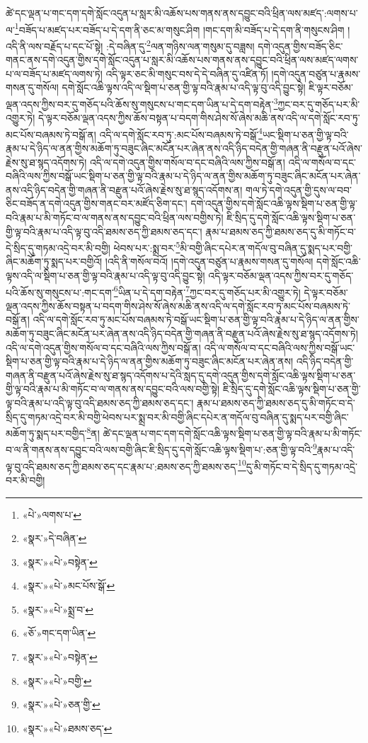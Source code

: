 ཚེ་དང་ལྡན་པ་གང་དག་དགེ་སློང་འདུན་པ་སླར་མི་འཆོས་པས་གནས་ནས་དབྱུང་བའི་ཕྲིན་ལས་མཛད་:ལགས་པ་ལ་\footnote{«པེ་»ལགས་པ་}བཟོད་པ་མཛད་པར་བཟོད་པ་དེ་དག་ནི་ཅང་མ་གསུང་ཤིག །གང་དག་མི་བཟོད་པ་དེ་དག་ནི་གསུངས་ཤིག །འདི་ནི་ལས་བརྗོད་པ་དང་པོ་སྟེ། :དེ་བཞིན་དུ་\footnote{«སྣར་»དེ་བཞིན་}ལན་གཉིས་ལན་གསུམ་དུ་བཟླས། དགེ་འདུན་གྱིས་བཟོད་ཅིང་གནང་ནས་དགེ་འདུན་གྱིས་དགེ་སློང་འདུན་པ་སླར་མི་འཆོས་པས་གནས་ནས་དབྱུང་བའི་ཕྲིན་ལས་མཛད་ལགས་པ་ལ་བཟོད་པ་མཛད་ལགས་ཏེ། འདི་ལྟར་ཅང་མི་གསུང་བས་དེ་དེ་བཞིན་དུ་འཛིན་ཏོ། །དགེ་འདུན་བཙུན་པ་རྣམས་གསན་དུ་གསོལ། དགེ་སློང་འཆི་ལྟས་འདི་ལ་སྡིག་པ་ཅན་གྱི་ལྟ་བའི་རྣམ་པ་འདི་ལྟ་བུ་འདི་བྱུང་སྟེ། ཇི་ལྟར་བཅོམ་ལྡན་འདས་ཀྱིས་བར་དུ་གཅོད་པའི་ཆོས་སུ་གསུངས་པ་གང་དག་ཡིན་པ་དེ་དག་བརྟེན་\footnote{«སྣར་»«པེ་»བསྟེན་}ཀྱང་བར་དུ་གཅོད་པར་མི་འགྱུར་ཏེ། དེ་ལྟར་བཅོམ་ལྡན་འདས་ཀྱིས་ཆོས་བསྟན་པ་བདག་གིས་ཤེས་སོ་ཞེས་མཆི་ནས་འདི་ལ་དགེ་སློང་རབ་ཏུ་མང་པོས་བཞམས་ཏེ་བསྒོ་ན། འདི་ལ་དགེ་སློང་རབ་ཏུ་:མང་པོས་བཞམས་ཏེ་བསྒོ་\footnote{«སྣར་»«པེ་»མང་པོས་སྒོ་}ཡང་སྡིག་པ་ཅན་གྱི་ལྟ་བའི་རྣམ་པ་དེ་ཉིད་ལ་ནན་གྱིས་མཆོག་ཏུ་བཟུང་ཞིང་མངོན་པར་ཞེན་ནས་འདི་ཉིད་བདེན་གྱི་གཞན་ནི་བརྫུན་པའོ་ཞེས་རྗེས་སུ་ཐ་སྙད་འདོགས་ཏེ། འདི་ལ་དགེ་འདུན་གྱིས་གསོལ་བ་དང་བཞིའི་ལས་ཀྱིས་བསྒོ་ན། འདི་ལ་གསོལ་བ་དང་བཞིའི་ལས་ཀྱིས་བསྒོ་ཡང་སྡིག་པ་ཅན་གྱི་ལྟ་བའི་རྣམ་པ་དེ་ཉིད་ལ་ནན་གྱིས་མཆོག་ཏུ་བཟུང་ཞིང་མངོན་པར་ཞེན་ནས་འདི་ཉིད་བདེན་གྱི་གཞན་ནི་བརྫུན་པའོ་ཞེས་རྗེས་སུ་ཐ་སྙད་འདོགས་ན། གལ་ཏེ་དགེ་འདུན་གྱི་དུས་ལ་བབ་ཅིང་བཟོད་ན་དགེ་འདུན་གྱིས་གནང་བར་མཛོད་ཅིག་དང་། དགེ་འདུན་གྱིས་དགེ་སློང་འཆི་ལྟས་སྡིག་པ་ཅན་གྱི་ལྟ་བའི་རྣམ་པ་མི་གཏོང་བ་ལ་གནས་ནས་དབྱུང་བའི་ཕྲིན་ལས་བགྱིས་ཏེ། ཇི་སྲིད་དུ་དགེ་སློང་འཆི་ལྟས་སྡིག་པ་ཅན་གྱི་ལྟ་བའི་རྣམ་པ་འདི་ལྟ་བུ་འདི་ཐམས་ཅད་ཀྱི་ཐམས་ཅད་དང་། རྣམ་པ་ཐམས་ཅད་ཀྱི་ཐམས་ཅད་དུ་མི་གཏོང་བ་དེ་སྲིད་དུ་གཏམ་འདྲེ་བར་མི་བགྱི། ཕེབས་པར་:སྨྲ་བར་\footnote{«སྣར་»«པེ་»སྨྲ་བ་}མི་བགྱི་ཞིང་དཔེར་ན་གདོལ་བུ་བཞིན་དུ་སྨད་པར་བགྱི་ཞིང་མཆོག་ཏུ་སྨད་པར་བགྱིའོ། །འདི་ནི་གསོལ་བའོ། །དགེ་འདུན་བཙུན་པ་རྣམས་གསན་དུ་གསོལ། དགེ་སློང་འཆི་ལྟས་འདི་ལ་སྡིག་པ་ཅན་གྱི་ལྟ་བའི་རྣམ་པ་འདི་ལྟ་བུ་འདི་བྱུང་སྟེ། འདི་ལྟར་བཅོམ་ལྡན་འདས་ཀྱིས་བར་དུ་གཅོད་པའི་ཆོས་སུ་གསུངས་པ་:གང་དག་\footnote{«ཅོ་»གང་དག་ཡིན་}ཡིན་པ་དེ་དག་བརྟེན་\footnote{«སྣར་»«པེ་»བསྟེན་}ཀྱང་བར་དུ་གཅོད་པར་མི་འགྱུར་ཏེ། དེ་ལྟར་བཅོམ་ལྡན་འདས་ཀྱིས་ཆོས་བསྟན་པ་བདག་གིས་ཤེས་སོ་ཞེས་མཆི་ནས་འདི་ལ་དགེ་སློང་རབ་ཏུ་མང་པོས་བཞམས་ཏེ་བསྒོ་ན། འདི་ལ་དགེ་སློང་རབ་ཏུ་མང་པོས་བཞམས་ཏེ་བསྒོ་ཡང་སྡིག་པ་ཅན་གྱི་ལྟ་བའི་རྣམ་པ་དེ་ཉིད་ལ་ནན་གྱིས་མཆོག་ཏུ་བཟུང་ཞིང་མངོན་པར་ཞེན་ནས་འདི་ཉིད་བདེན་གྱི་གཞན་ནི་བརྫུན་པའོ་ཞེས་རྗེས་སུ་ཐ་སྙད་འདོགས་ཏེ། འདི་ལ་དགེ་འདུན་གྱིས་གསོལ་བ་དང་བཞིའི་ལས་ཀྱིས་བསྒོ་ན། འདི་ལ་གསོལ་བ་དང་བཞིའི་ལས་ཀྱིས་བསྒོ་ཡང་སྡིག་པ་ཅན་གྱི་ལྟ་བའི་རྣམ་པ་དེ་ཉིད་ལ་ནན་གྱིས་མཆོག་ཏུ་བཟུང་ཞིང་མངོན་པར་ཞེན་ནས། འདི་ཉིད་བདེན་གྱི་གཞན་ནི་བརྫུན་པའོ་ཞེས་རྗེས་སུ་ཐ་སྙད་འདོགས་པ་དེའི་སླད་དུ་དགེ་འདུན་གྱིས་དགེ་སློང་འཆི་ལྟས་སྡིག་པ་ཅན་གྱི་ལྟ་བའི་རྣམ་པ་མི་གཏོང་བ་ལ་གནས་ནས་དབྱུང་བའི་ལས་བགྱི་སྟེ། ཇི་སྲིད་དུ་དགེ་སློང་འཆི་ལྟས་སྡིག་པ་ཅན་གྱི་ལྟ་བའི་རྣམ་པ་འདི་ལྟ་བུ་འདི་ཐམས་ཅད་ཀྱི་ཐམས་ཅད་དང་། རྣམ་པ་ཐམས་ཅད་ཀྱི་ཐམས་ཅད་དུ་མི་གཏོང་བ་དེ་སྲིད་དུ་གཏམ་འདྲེ་བར་མི་བགྱི་ཕེབས་པར་སྨྲ་བར་མི་བགྱི་ཞིང་དཔེར་ན་གདོལ་བུ་བཞིན་དུ་སྨད་པར་བགྱི་ཞིང་མཆོག་ཏུ་སྨད་པར་བགྱིད་\footnote{«སྣར་»«པེ་»བགྱི་}ན། ཚེ་དང་ལྡན་པ་གང་དག་དགེ་སློང་འཆི་ལྟས་སྡིག་པ་ཅན་གྱི་ལྟ་བའི་རྣམ་པ་མི་གཏོང་བ་ལ་ནི་གནས་ནས་དབྱུང་བའི་ལས་བགྱི་ཞིང་ཇི་སྲིད་དུ་དགེ་སློང་འཆི་ལྟས་སྡིག་པ་:ཅན་གྱི་ལྟ་བའི་\footnote{«སྣར་»«པེ་»ཅན་གྱི་}རྣམ་པ་འདི་ལྟ་བུ་འདི་ཐམས་ཅད་ཀྱི་ཐམས་ཅད་དང་རྣམ་པ་:ཐམས་ཅད་ཀྱི་ཐམས་ཅད་\footnote{«སྣར་»«པེ་»ཐམས་ཅད་}དུ་མི་གཏོང་བ་དེ་སྲིད་དུ་གཏམ་འདྲེ་བར་མི་བགྱི། 